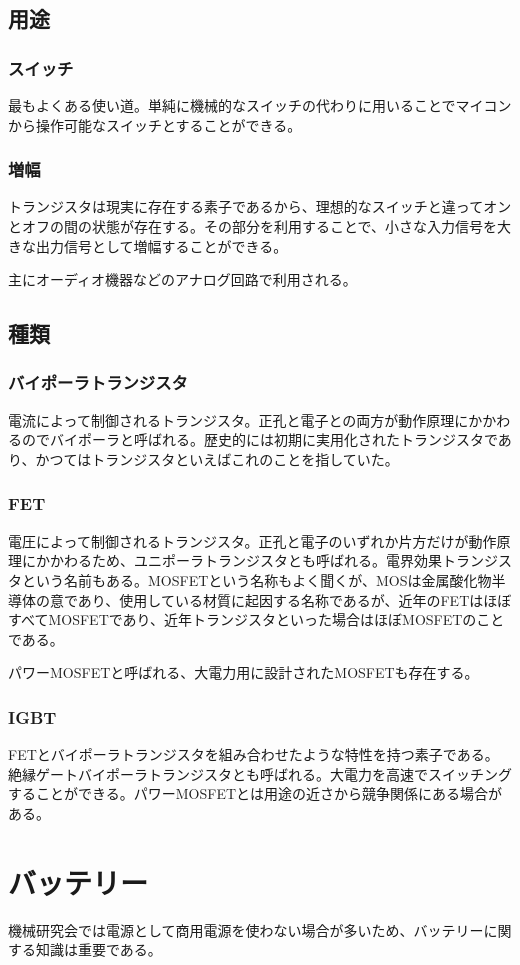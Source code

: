 \documentclass[a4paper,titlepage]{ujarticle}
\begin{document}
\subsection{用途}
\subsubsection{スイッチ}
最もよくある使い道。単純に機械的なスイッチの代わりに用いることでマイコンから操作可能なスイッチとすることができる。
\subsubsection{増幅}
トランジスタは現実に存在する素子であるから、理想的なスイッチと違ってオンとオフの間の状態が存在する。その部分を利用することで、小さな入力信号を大きな出力信号として増幅することができる。

主にオーディオ機器などのアナログ回路で利用される。
\subsection{種類}
\subsubsection{バイポーラトランジスタ}
電流によって制御されるトランジスタ。正孔と電子との両方が動作原理にかかわるのでバイポーラと呼ばれる。歴史的には初期に実用化されたトランジスタであり、かつてはトランジスタといえばこれのことを指していた。
\subsubsection{FET}
電圧によって制御されるトランジスタ。正孔と電子のいずれか片方だけが動作原理にかかわるため、ユニポーラトランジスタとも呼ばれる。電界効果トランジスタという名前もある。MOSFETという名称もよく聞くが、MOSは金属酸化物半導体の意であり、使用している材質に起因する名称であるが、近年のFETはほぼすべてMOSFETであり、近年トランジスタといった場合はほぼMOSFETのことである。

パワーMOSFETと呼ばれる、大電力用に設計されたMOSFETも存在する。
\subsubsection{IGBT}
FETとバイポーラトランジスタを組み合わせたような特性を持つ素子である。絶縁ゲートバイポーラトランジスタとも呼ばれる。大電力を高速でスイッチングすることができる。パワーMOSFETとは用途の近さから競争関係にある場合がある。
\section{バッテリー}
機械研究会では電源として商用電源を使わない場合が多いため、バッテリーに関する知識は重要である。
\end{document}

